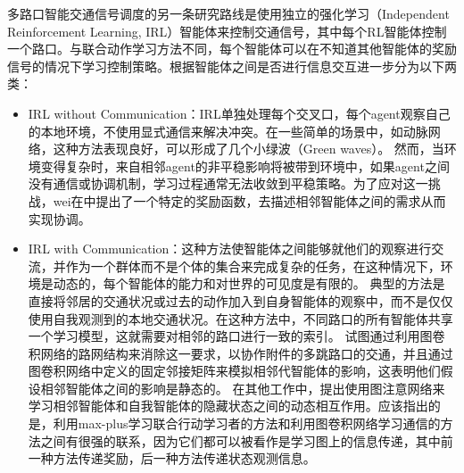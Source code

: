 多路口智能交通信号调度的另一条研究路线是使用独立的强化学习（Independent Reinforcement Learning, IRL）智能体来控制交通信号，其中每个RL智能体控制一个路口。与联合动作学习方法不同，每个智能体可以在不知道其他智能体的奖励信号的情况下学习控制策略。根据智能体之间是否进行信息交互进一步分为以下两类：
\begin{itemize}
  \item IRL without Communication：IRL单独处理每个交叉口，每个agent观察自己的本地环境，不使用显式通信来解决冲突。在一些简单的场景中，如动脉网络，这种方法表现良好，可以形成了几个小绿波（Green waves）。
  然而，当环境变得复杂时，来自相邻agent的非平稳影响将被带到环境中，如果agent之间没有通信或协调机制，学习过程通常无法收敛到平稳策略。为了应对这一挑战，wei在中提出了一个特定的奖励函数，去描述相邻智能体之间的需求从而实现协调。
  
  \item IRL with Communication：这种方法使智能体之间能够就他们的观察进行交流，并作为一个群体而不是个体的集合来完成复杂的任务，在这种情况下，环境是动态的，每个智能体的能力和对世界的可见度是有限的。
  典型的方法是直接将邻居的交通状况或过去的动作加入到自身智能体的观察中，而不是仅仅使用自我观测到的本地交通状况。在这种方法中，不同路口的所有智能体共享一个学习模型，这就需要对相邻的路口进行一致的索引。
  试图通过利用图卷积网络的路网结构来消除这一要求，以协作附件的多跳路口的交通，并且通过图卷积网络中定义的固定邻接矩阵来模拟相邻代智能体的影响，这表明他们假设相邻智能体之间的影响是静态的。
  在其他工作中，提出使用图注意网络来学习相邻智能体和自我智能体的隐藏状态之间的动态相互作用。应该指出的是，利用max-plus学习联合行动学习者的方法和利用图卷积网络学习通信的方法之间有很强的联系，因为它们都可以被看作是学习图上的信息传递，其中前一种方法传递奖励，后一种方法传递状态观测信息。
\end{itemize}

